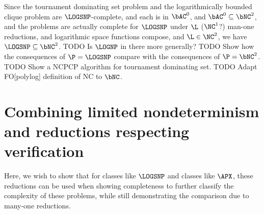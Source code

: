 \documentclass{article}
\begin{document}
Since the tournament dominating set problem and the logarithmically bounded clique problem are $\LOGSNP$-complete, and each is in $\bAC^0$, and $\bAC^0 \subseteq \bNC^2$, and the problems are actually complete for $\LOGSNP$ under $\L$ ($\NC^1$?) man-one reductions, and logarithmic space functions compose, and $\L \in \NC^2$, we have $\LOGSNP \subseteq \bNC^2$.
TODO Is $\LOGNP$ in there more generally?
TODO Show how the consequences of $\P = \LOGSNP$ compare with the consequences of $\P = \bNC^2$.
TODO Show a NCPCP algorithm for tournament dominating set.
TODO Adapt FO[polylog] definition of NC to $\bNC$.

\section{Combining limited nondeterminism and reductions respecting verification}

Here, we wish to show that for classes like $\LOGSNP$ and classes like $\APX$, these reductions can be used when showing completeness to further classify the complexity of these problems, while still demonstrating the comparison due to many-one reductions.

\printbibliography
\end{document}

